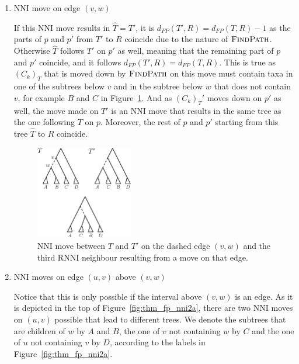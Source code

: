 \documentclass{amsart}
\newcommand{\rnni}{\mathrm{RNNI}}
\newcommand{\findpath}{\textsc{FindPath}}
\newcommand{\nni}{\mathrm{NNI}}
\begin{document}
\begin{enumerate}
    \item $\nni$ move on edge $(v,w)$

    If this $\nni$ move results in $\hat T = T'$, it is $d_{FP}(T',R) = d_{FP}(T,R) - 1$ as the parts of $p$ and $p'$ from $T'$ to $R$ coincide due to the nature of $\findpath$.
    Otherwise $\hat T$ follows $T'$ on $p'$ as well, meaning that the remaining part of $p$ and $p'$ coincide, and it follows $d_{FP}(T',R) = d_{FP}(T,R)$.
    This is true as $(C_k)_T$ that is moved down by $\findpath$ on this move must contain taxa in one of the subtrees below $v$ and in the subtree below $w$ that does not contain $v$, for example $B$ and $C$ in Figure~\ref{fig:thm_fp_nni1}.
    And as $(C_k)_T'$ moves down on $p'$ as well, the move made on $T'$ is an $\nni$ move that results in the same tree as the one following $T$ on $p$.
    Moreover, the rest of $p$ and $p'$ starting from this tree $\hat T$ to $R$ coincide.

    \begin{figure}[!hbt]
    \centering
    \includegraphics[width=0.4\textwidth]{thm_fp_nni1}
    \vspace{12pt}
    \caption{$\nni$ move between $T$ and $T'$ on the dashed edge $(v,w)$ and the third $\rnni$ neighbour resulting from a move on that edge.}
    \label{fig:thm_fp_nni1}
    \end{figure}

    \item $\nni$ moves on edge $(u,v)$ above $(v,w)$

    Notice that this is only possible if the interval above $(v,w)$ is an edge.
    As it is depicted in the top of Figure~\ref{fig:thm_fp_nni2a}, there are two $\nni$ moves on $(u,v)$ possible that lead to different trees.
    We denote the subtrees that are children of $w$ by $A$ and $B$, the one of $v$ not containing $w$ by $C$ and the one of $u$ not containing $v$ by $D$, according to the labels in Figure~\ref{fig:thm_fp_nni2a}.


\end{enumerate}
\end{document}

